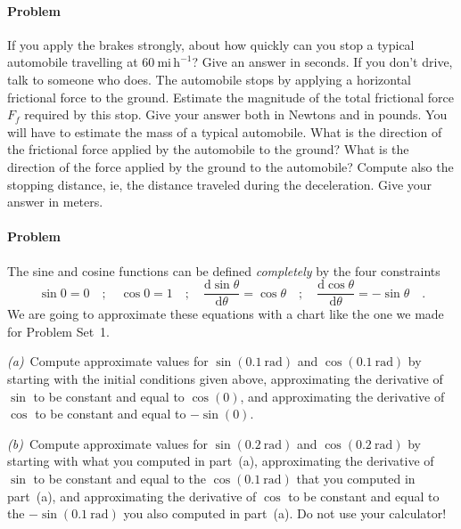 \documentclass[12pt]{article}
\newcounter{problem}
\begin{document}
\paragraph{Problem~\theproblem}

If you apply the brakes strongly, about how quickly can you stop a
typical automobile travelling at $60~\mathrm{mi\,h^{-1}}$?  Give an
answer in seconds.  If you don't drive, talk to someone who does.  The
automobile stops by applying a horizontal frictional force to the
ground.  Estimate the magnitude of the total frictional force $F_f$
required by this stop.  Give your answer both in Newtons and in
pounds.  You will have to estimate the mass of a typical automobile.
What is the direction of the frictional force applied by the
automobile to the ground?  What is the direction of the force applied
by the ground to the automobile?  Compute also the stopping distance,
ie, the distance traveled during the deceleration.  Give your answer
in meters.

\paragraph{Problem~\theproblem}

The sine and cosine functions can be defined \emph{completely} by the
four constraints
\begin{equation}
\sin 0=0 \quad ;\quad
\cos 0=1 \quad ;\quad
\frac{\mathrm{d}\sin\theta}{\mathrm{d}\theta}=\cos\theta \quad ;\quad
\frac{\mathrm{d}\cos\theta}{\mathrm{d}\theta}=-\sin\theta \quad .
\nonumber
\end{equation}
We are going to approximate these equations with a chart like the one
we made for Problem Set~1.

\textsl{(a)}~Compute approximate values for $\sin (0.1~\mathrm{rad})$
and $\cos (0.1~\mathrm{rad})$ by starting with the initial conditions
given above, approximating the derivative of $\sin$ to be constant and
equal to $\cos (0)$, and approximating the derivative of $\cos$ to be
constant and equal to $-\sin (0)$.

\textsl{(b)}~Compute approximate values for $\sin (0.2~\mathrm{rad})$
and $\cos (0.2~\mathrm{rad})$ by starting with what you computed in
part~(a), approximating the derivative of $\sin$ to be constant and
equal to the $\cos (0.1~\mathrm{rad})$ that you computed in part~(a),
and approximating the derivative of $\cos$ to be constant and equal to
the $-\sin (0.1~\mathrm{rad})$ you also computed in part~(a).  Do not
use your calculator!
\end{document}
